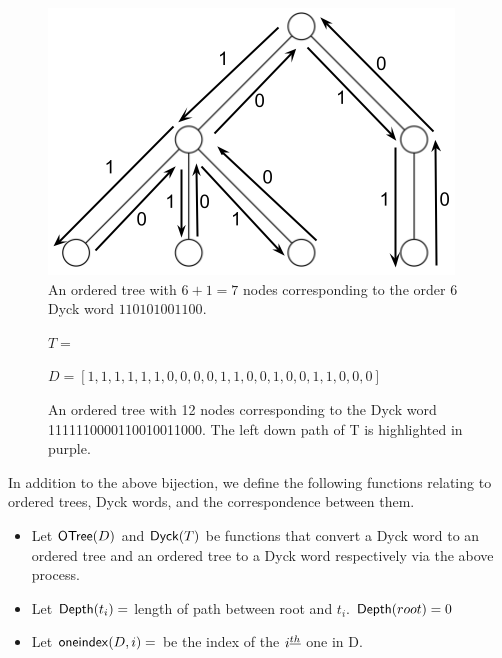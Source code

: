 \begin{figure}
    \centering
    \includegraphics{otreebij.png}
    \caption{An ordered tree with $6+1=7$ nodes corresponding to the order 6 Dyck word $110101001100$.}
    \label{ordered_tree_bijection_illustration}
\end{figure}


\begin{figure}
    $T=$


    $D=[1, 1, 1, 1, 1, 1, 0, 0, 0, 0, 1, 1, 0, 0, 1, 0, 0, 1, 1, 0, 0, 0]$
    \caption{An ordered tree with 12 nodes corresponding to the Dyck word 1111110000110010011000.  The left down path of T is highlighted in purple. }
    \label{exampleotree}
\end{figure}

In addition to the above bijection, we define the following functions relating to ordered trees, Dyck words, and the correspondence between them.

\begin{itemize}
    \item Let $\mathsf{OTree}{(D)}$ and $\mathsf{Dyck}{(T)}$ be functions that convert a Dyck word to an ordered tree and an ordered tree to a Dyck word respectively via the above process.
    \item Let $\mathsf{Depth}{(t_i)}=$ length of path between root and $t_i$. $\mathsf{Depth}{(root)}=0$
    \item Let $\mathsf{oneindex}({D}, i)=$ be the index of the $i^{\underline{th}}{}$ one in D.
\end{itemize}

